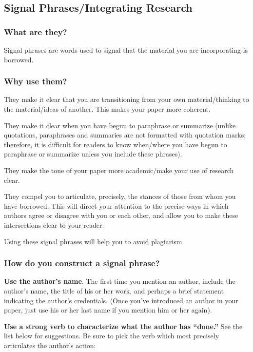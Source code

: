 \documentclass[12pt, hidelinks]{article} %
\begin{document}
\subsection{Signal Phrases/Integrating Research}
 
 
\subsubsection{What are they?}
 
Signal phrases are words used to signal that the material you are incorporating is borrowed.
 
\subsubsection {Why use them?}
 
They make it clear that you are transitioning from your own material/thinking to the material/ideas of another. This makes your paper more coherent.
 
They make it clear when you have begun to paraphrase or summarize (unlike quotations, paraphrases and summaries are not formatted with quotation marks; therefore, it is difficult for readers to know when/where you have begun to paraphrase or summarize unless you include these phrases).
 
They make the tone of your paper more academic/make your use of research clear.
 
They compel you to articulate, precisely, the stances of those from whom you have borrowed. This will direct your attention to the precise ways in which authors agree or disagree with you or each other, and allow you to make these intersections clear to your reader.
 
Using these signal phrases will help you to avoid plagiarism.
 
 
\subsubsection{How do you construct a signal phrase?}
 
\textbf{Use the author's name}. The first time you mention an author, include the author's name, the title of his or her work, and perhaps a brief statement indicating the author's credentials. (Once you've introduced an author in your paper, just use his or her last name if you mention him or her again).

\textbf{Use a strong verb to characterize what the author has “done.”} See the list below for suggestions. Be sure to pick the verb which most precisely articulates the author's action:
 
\end{document}
